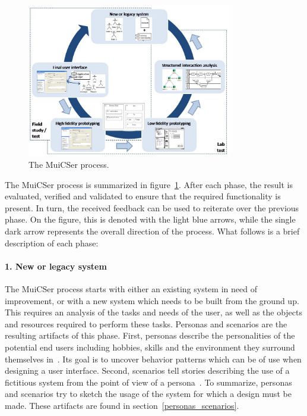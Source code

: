         \begin{figure}[!t]
            \centering
            \includegraphics[width=0.8\textwidth]{chapters/3_design/muicser}
            \caption{The MuiCSer process.}\label{fig:muicser}
        \end{figure}

        The MuiCSer process is summarized in figure~\ref{fig:muicser}. After each phase, the result is evaluated, verified and validated to ensure that the required functionality is present. In turn, the received feedback can be used to reiterate over the previous phase. On the figure, this is denoted with the light blue arrows, while the single dark arrow represents the overall direction of the process. What follows is a brief description of each phase:

        \paragraph{1. New or legacy system} The MuiCSer process starts with either an existing system in need of improvement, or with a new system which needs to be built from the ground up. This requires an analysis of the tasks and needs of the user, as well as the objects and resources required to perform these tasks. Personas and scenarios are the resulting artifacts of this phase. First, personas describe the personalities of the potential end users including hobbies, skills and the environment they surround themselves in~\cite{Madsen2010}. Its goal is to uncover behavior patterns which can be of use when designing a user interface. Second, scenarios tell stories describing the use of a fictitious system from the point of view of a persona~\cite{Madsen2010}. To summarize, personas and scenarios try to sketch the usage of the system for which a design must be made. These artifacts are found in section~\ref{personas_scenarios}.

